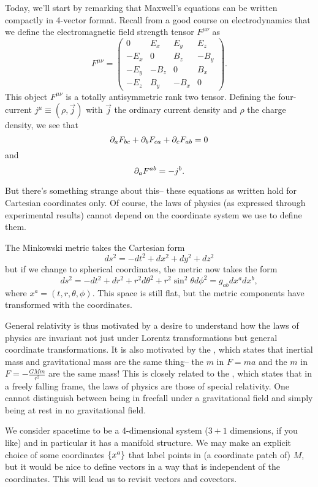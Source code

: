 Today, we'll start by remarking that Maxwell's equations can be written compactly in 4-vector format. Recall from a good course on electrodynamics that we define the electromagnetic field strength tensor $F^{\mu\nu}$ as
\begin{equation}
F^{\mu\nu}=\begin{pmatrix}
0& E_x & E_y & E_z\\
-E_x & 0 & B_z & - B_y\\
-E_y & -B_z & 0 & B_x\\
-E_z & B_y & -B_x & 0
\end{pmatrix}.
\end{equation}
This object $F^{\mu\nu}$ is a totally antisymmetric rank two tensor. Defining the four-current $j^\mu \equiv(\rho, \vec{j})$ with $\vec{j}$ the ordinary current density and $\rho$ the charge density, we see that
$$\partial_a F_{bc} +\partial_b F_{ca} +\partial_c F_{ab}=0$$
and
$$\partial_a F^{ab}=-j^b.$$

But there's something strange about this-- these equations as written hold for Cartesian coordinates only. Of course, the laws of physics (as expressed through experimental results) cannot depend on the coordinate system we use to define them. 
\begin{exm}
The Minkowski metric takes the Cartesian form
$$ds^2=-dt^2+dx^2+dy^2+dz^2$$
but if we change to spherical coordinates, the metric now takes the form 
$$ds^2=-dt^2+dr^2+r^2d\theta^2 +r^2 \sin^2 \theta d\phi^2=g_{ab}dx^a dx^b,$$
where $x^a=(t,r,\theta,\phi).$ This space is still flat, but the metric components have transformed with the coordinates.
\end{exm}

General relativity is thus motivated by a desire to understand how the laws of physics are invariant not just under Lorentz transformations but general coordinate transformations. It is also motivated by the , which states that inertial mass and gravitational mass are the same thing-- the $m$ in $F=ma$ and the $m$ in $F=-\frac{GMm }{r^2}$ are the same mass! This is closely related to the , which states that in a freely falling frame, the laws of physics are those of special relativity. One cannot distinguish between being in freefall under a gravitational field and simply being at rest in no gravitational field.

We consider spacetime to be a 4-dimensional system ($3+1$ dimensions, if you like) and in particular it has a manifold structure. We may make an explicit choice of some coordinates $\{x^a\}$ that label points in (a coordinate patch of) $M$, but it would be nice to define vectors in a way that is independent of the coordinates. This will lead us to revisit vectors and covectors.

